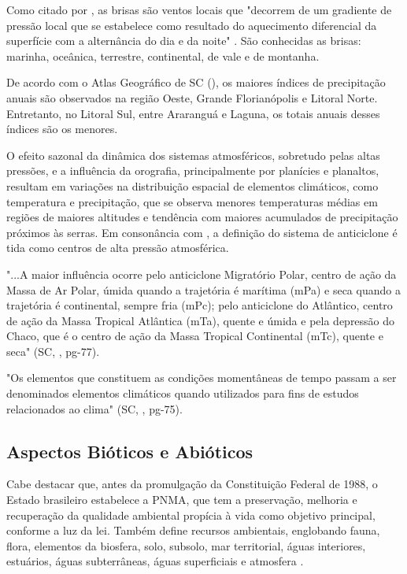 \indent Como citado por , as brisas são ventos locais que "decorrem de um gradiente de pressão local que se estabelece como resultado do aquecimento diferencial da superfície com a alternância do dia e da noite" . São conhecidas as brisas: marinha, oceânica, terrestre, continental, de vale e de montanha.

\indent De acordo com o Atlas Geográfico de \acrlong{SC} (\citeyear{AtlasSCnatureza}), os maiores índices de precipitação anuais são observados na região Oeste, Grande Florianópolis e Litoral Norte. Entretanto, no Litoral Sul, entre Araranguá e Laguna, os totais anuais desses índices são os menores.

\indent O efeito sazonal da dinâmica dos sistemas atmosféricos, sobretudo pelas altas pressões, e a influência da orografia, principalmente por planícies e planaltos, resultam em variações na distribuição espacial de elementos climáticos, como temperatura e precipitação, que se observa menores temperaturas médias em regiões de maiores altitudes e tendência com maiores acumulados de precipitação próximos às serras. Em consonância com , a definição do sistema de anticiclone é tida como centros de alta pressão atmosférica.

\begin{citacao}
"...A maior influência ocorre pelo anticiclone Migratório Polar, centro de ação da Massa de Ar Polar, úmida quando a trajetória é marítima (mPa) e seca quando a trajetória é continental, sempre fria (mPc); pelo anticiclone do Atlântico, centro de ação da Massa Tropical Atlântica (mTa), quente e úmida e pela depressão do Chaco, que é o centro de ação da Massa Tropical Continental (mTc), quente e seca" (\acrlong{SC}, \citeyear{AtlasSCnatureza}, pg-77).
\end{citacao}

\indent "Os elementos que constituem as condições momentâneas de tempo passam a ser denominados elementos climáticos quando utilizados para fins de estudos relacionados ao clima" (\acrlong{SC}, \citeyear{AtlasSCnatureza}, pg-75).

\subsection{Aspectos Bióticos e Abióticos}

\indent Cabe destacar que, antes da promulgação da Constituição Federal de 1988, o Estado brasileiro estabelece a \acrfull{PNMA}, que tem a preservação, melhoria e recuperação da qualidade ambiental propícia à vida como objetivo principal, conforme a luz da lei. Também define recursos ambientais, englobando fauna, flora, elementos da biosfera, solo, subsolo, mar territorial, águas interiores, estuários, águas subterrâneas, águas superficiais e atmosfera  \cite{BRASIL1981LeiPNMA}.

